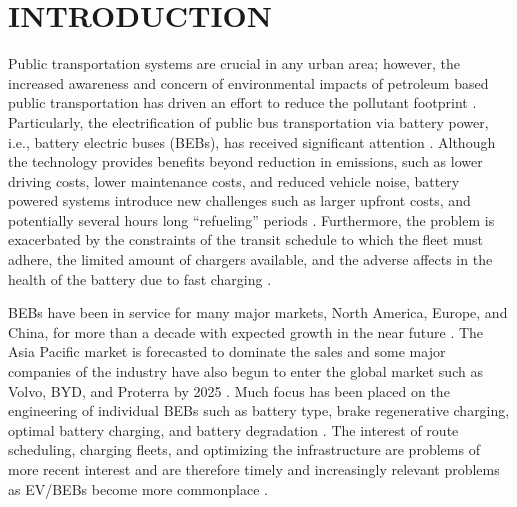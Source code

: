 \documentclass[ee,thesis]{usuthesis}
\begin{document}
\body  %

\chapter{INTRODUCTION}
\label{sec:introduction}
Public transportation systems are crucial in any urban area; however, the increased awareness and concern of
environmental impacts of petroleum based public transportation has driven an effort to reduce the pollutant footprint
\cite{de-2014-simul-elect,xylia-2018-role-charg,guida-2017-zeeus-repor-europ,li-2016-batter-elect}. Particularly,
the electrification of public bus transportation via battery power, i.e., battery electric buses (BEBs), has received
significant attention \cite{li-2016-batter-elect}. Although the technology provides benefits beyond reduction in
emissions, such as lower driving costs, lower maintenance costs, and reduced vehicle noise, battery powered systems
introduce new challenges such as larger upfront costs, and potentially several hours long ``refueling'' periods
\cite{xylia-2018-role-charg,li-2016-batter-elect}. Furthermore, the problem is exacerbated by the constraints of the
transit schedule to which the fleet must adhere, the limited amount of chargers available, and the adverse affects in
the health of the battery due to fast charging \cite{lutsey-2019-updat-elect}.

BEBs have been in service for many major markets, North America, Europe, and China, for more than a decade with expected
growth in the near future \cite{deng-2021-survey-elect}. The Asia Pacific market is forecasted to dominate the sales
and some major companies of the industry have also begun to enter the global market such as Volvo, BYD, and Proterra by
2025 \cite{deng-2021-survey-elect}. Much focus has been placed on the engineering of individual BEBs such as battery
type, brake regenerative charging, optimal battery charging, and battery degradation \cite{chen-2008-desig-grey,abdollahi-2016-optim-batter,kuhne-2010-elect,deng-2021-survey-elect}. The interest of route scheduling, charging
fleets, and optimizing the infrastructure are problems of more recent interest and are therefore timely and increasingly
relevant problems as EV/BEBs become more commonplace \cite{hoke-2014-accoun-lithium,sebastiani-2016-evaluat-elect,wei-2018-optim-spatio}.
\end{document}
